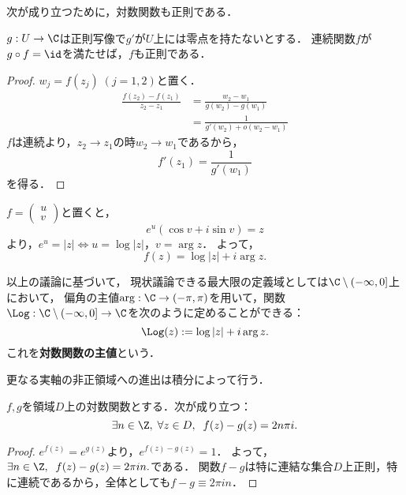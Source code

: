 \documentclass[uplatex, dvipdfmx]{jsreport}
\begin{document}
次が成り立つために，対数関数も正則である．

\begin{theorem}[正則性の遺伝]
    $g:U\to\C$は正則写像で$g'$が$U$上には零点を持たないとする．
    連続関数$f$が$g\circ f=\id$を満たせば，$f$も正則である．
\end{theorem}
\begin{proof}
    $w_j=f(z_j)\;(j=1,2)$と置く．
    \begin{align*}
        \frac{f(z_2)-f(z_1)}{z_2-z_1} &= \frac{w_2-w_1}{g(w_2)-g(w_1)}\\
        &= \frac{1}{g'(w_2)+o(w_2-w_1)}
    \end{align*}
    $f$は連続より，$z_2\to z_1$の時$w_2\to w_1$であるから，
    \[ f'(z_1)=\frac{1}{g'(w_1)} \]
    を得る．
\end{proof}

\begin{discussion}[対数関数の形についての必要条件]
    $f=\begin{pmatrix}u\\v\end{pmatrix}$と置くと，
    \[ e^u(\cos v+i\sin v)=z \]
    より，$e^u=|z|\Leftrightarrow u=\log|z|$，$v=\arg z$．
    よって，
    \[ f(z) = \log|z| + i\arg z. \]
\end{discussion}

\begin{definition}\label{def-principle-value-of-log}
    以上の議論に基づいて，
    現状議論できる最大限の定義域としては$\C\setminus(-\infty,0]$上において，
    偏角の主値$\arg:\C\to(-\pi,\pi)$を用いて，関数$\Log:\C\setminus(-\infty,0]\to\C$を次のように定めることができる：
    \[ \Log(z):=\log|z|+i\arg z. \]
    これを\textbf{対数関数の主値}という．
    
    更なる実軸の非正領域への進出は積分によって行う．
\end{definition}

\begin{theorem}[対数関数は定値関数分の差を除いて一意]\label{thm-period-of-logarithm}
    $f,g$を領域$D$上の対数関数とする．次が成り立つ：
    \[ \exists n\in\Z,\;\forall z\in D,\; \;f(z)-g(z)=2n\pi i. \]
\end{theorem}
\begin{proof}
    $e^{f(z)}=e^{g(z)}$より，$e^{f(z)-g(z)}=1$．
    よって，$\exists n\in\Z,\; \;f(z)-g(z)=2\pi in.$である．
    関数$f-g$は特に連結な集合$D$上正則，特に連続であるから，全体としても$f-g\equiv 2\pi in$．
\end{proof}
\end{document}
